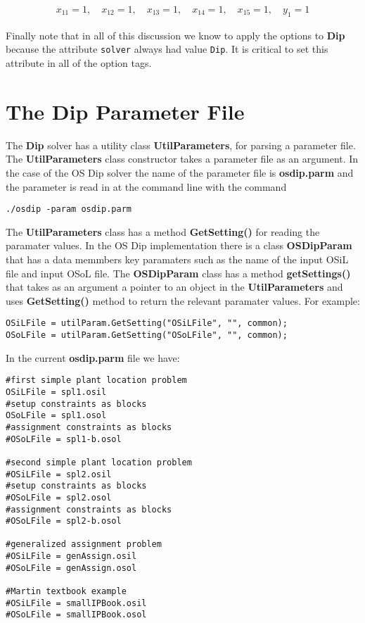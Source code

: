 \documentclass[11pt]{article}
\begin{document}
\begin{eqnarray*}
x_{11} = 1, \quad  x_{12} = 1, \quad  x_{13} = 1, \quad  x_{14} = 1, \quad
x_{15} = 1, \quad y_{1} = 1
\end{eqnarray*}


Finally note that in all of this discussion we know to apply the options to {\bf
Dip} because the attribute {\tt solver} always had value {\tt Dip}. It is
critical to set this attribute in all of the option tags. 


\section{The Dip Parameter File}\label{section:paramaterfile}

The {\bf Dip} solver has a utility class {\bf UtilParameters},  for parsing
a parameter file. The {\bf UtilParameters} class constructor takes a parameter
file as an argument. In the case of the OS Dip solver the name of the parameter
file is {\bf osdip.parm} and the parameter is read in at the command line with
the command

\begin{verbatim}
./osdip -param osdip.parm
\end{verbatim}

The {\bf UtilParameters} class has a method {\bf GetSetting()} for reading the
paramater values. In the OS Dip implementation there is a class {\bf OSDipParam}
that has a data memmbers key paramaters such as the name of the input OSiL file
and input OSoL file. The {\bf OSDipParam} class has a method
{\bf getSettings()} that takes as an argument a pointer to an object in the {\bf
UtilParameters} and uses {\bf GetSetting()} method to return the relevant
paramater values. For example:

\begin{verbatim}
OSiLFile = utilParam.GetSetting("OSiLFile", "", common); 
OSoLFile = utilParam.GetSetting("OSoLFile", "", common);
\end{verbatim}

In the current {\bf osdip.parm} file we have:

\begin{verbatim}
#first simple plant location problem
OSiLFile = spl1.osil
#setup constraints as blocks
OSoLFile = spl1.osol
#assignment constraints as blocks
#OSoLFile = spl1-b.osol

#second simple plant location problem
#OSiLFile = spl2.osil
#setup constraints as blocks
#OSoLFile = spl2.osol
#assignment constraints as blocks
#OSoLFile = spl2-b.osol

#generalized assignment problem
#OSiLFile = genAssign.osil
#OSoLFile = genAssign.osol

#Martin textbook example
#OSiLFile = smallIPBook.osil
#OSoLFile = smallIPBook.osol
\end{verbatim}
 
\end{document}
